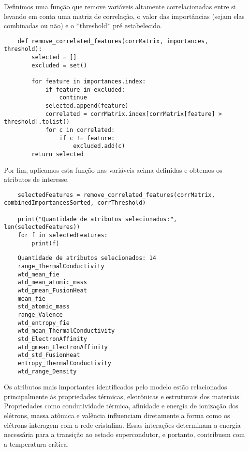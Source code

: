 Definimos uma função que remove variáveis altamente correlacionadas entre si levando em conta uma matriz de correlação, o valor das importâncias (sejam elas combinadas ou não) e o *threshold* pré estabelecido.
\begin{longlisting}
    \begin{verbatim}
    def remove_correlated_features(corrMatrix, importances, threshold):
        selected = []
        excluded = set()

        for feature in importances.index:
            if feature in excluded:
                continue
            selected.append(feature)
            correlated = corrMatrix.index[corrMatrix[feature] > threshold].tolist()
            for c in correlated:
                if c != feature:
                    excluded.add(c)
        return selected
    \end{verbatim}
\end{longlisting}

Por fim, aplicamos esta função nas variáveis acima definidas e obtemos os atributos de interesse.
\begin{longlisting}
    \begin{verbatim}
    selectedFeatures = remove_correlated_features(corrMatrix, combinedImportancesSorted, corrThreshold)

    print("Quantidade de atributos selecionados:", len(selectedFeatures))
    for f in selectedFeatures:
        print(f)
    \end{verbatim}
\end{longlisting}
\begin{verbatim}
    Quantidade de atributos selecionados: 14
    range_ThermalConductivity
    wtd_mean_fie
    wtd_mean_atomic_mass
    wtd_gmean_FusionHeat
    mean_fie
    std_atomic_mass
    range_Valence
    wtd_entropy_fie
    wtd_mean_ThermalConductivity
    std_ElectronAffinity
    wtd_gmean_ElectronAffinity
    wtd_std_FusionHeat
    entropy_ThermalConductivity
    wtd_range_Density
\end{verbatim}

Os atributos mais importantes identificados pelo modelo estão relacionados principalmente às propriedades térmicas, eletrônicas e estruturais dos materiais. Propriedades como condutividade térmica, afinidade e energia de ionização dos elétrons, massa atômica e valência influenciam diretamente a forma como os elétrons interagem com a rede cristalina. Essas interações determinam a energia necessária para a transição ao estado supercondutor, e portanto, contribuem com a temperatura crítica.